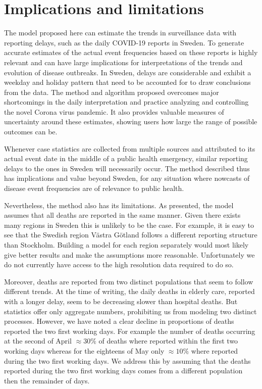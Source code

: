 \documentclass[a4paper,11pth]{article}
\begin{document}
\section{Implications and limitations}
The model proposed here can estimate the trends in surveillance data with reporting delays, such as the daily COVID-19 reports in Sweden. To generate accurate estimates of the actual event frequencies based on these reports is highly relevant and can have large implications for interpretations of the trends and evolution of disease outbreaks. In Sweden, delays are considerable and exhibit a weekday and holiday pattern that need to be accounted for to draw conclusions from the data. The method and algorithm proposed overcomes major shortcomings in the daily interpretation and practice analyzing and controlling the novel Corona virus pandemic. It also provides valuable measures of uncertainty around these estimates, showing users how large the range of possible outcomes can be.

Whenever case statistics are collected from multiple sources and attributed to its actual event date in the middle of a public health emergency, similar reporting delays to the ones in Sweden will necessarily occur. The method described thus has implications and value beyond Sweden, for any situation where nowcasts of disease event frequencies are of relevance to public health.

Nevertheless, the method also has its limitations. As presented, the model assumes that all deaths are reported in the same manner. Given there exists many regions in Sweden this is unlikely to be the case. For example, it is easy to see that the Swedish region Västra Götland follows a different reporting structure than Stockholm. Building a model for each region separately would most likely give better results and make the assumptions more reasonable. Unfortunately we do not currently have access to the high resolution data required to do so. 

Moreover, deaths are reported from two distinct populations that seem to follow different trends. At the time of writing, the daily deaths in elderly care, reported with a longer delay, seem to be decreasing slower than hospital deaths. But statistics offer only aggregate numbers, prohibiting us from modeling two distinct processes. However, we have noted a clear decline in proportions of deaths reported the two first working days. For example the number of deaths occurring at the second of April $\approx 30\%$ of deaths where reported within the first two working days whereas for the eighteens of May only $\approx 10\%$ where reported during the two first working days. We address this by assuming that the deaths reported during the two first working days comes from a different population then the remainder of days.
\end{document}
